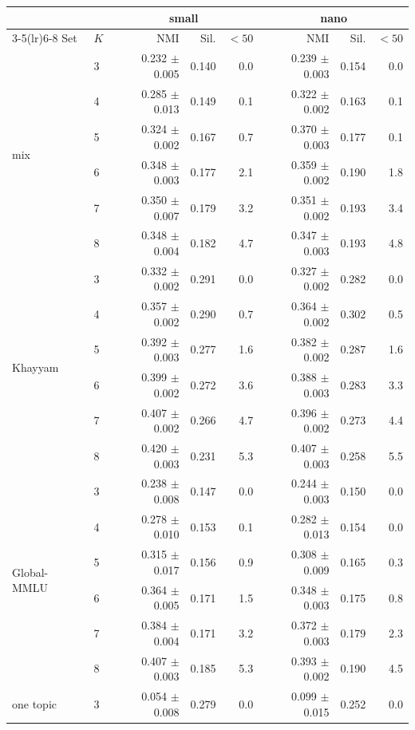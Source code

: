 \begin{tabular}{llrrrrrr}
\toprule
 & & \multicolumn{3}{c}{small} & \multicolumn{3}{c}{nano} \\
\cmidrule(lr){3-5}\cmidrule(lr){6-8}
Set & $K$ & NMI & Sil. & $<50$ & NMI & Sil. & $<50$ \\
\midrule
\multirow{6}{*}{mix} & 3 & 0.232 $\pm$ 0.005 & 0.140 & 0.0 & 0.239 $\pm$ 0.003 & 0.154 & 0.0 \\
 & 4 & 0.285 $\pm$ 0.013 & 0.149 & 0.1 & 0.322 $\pm$ 0.002 & 0.163 & 0.1 \\
 & 5 & 0.324 $\pm$ 0.002 & 0.167 & 0.7 & 0.370 $\pm$ 0.003 & 0.177 & 0.1 \\
 & 6 & 0.348 $\pm$ 0.003 & 0.177 & 2.1 & 0.359 $\pm$ 0.002 & 0.190 & 1.8 \\
 & 7 & 0.350 $\pm$ 0.007 & 0.179 & 3.2 & 0.351 $\pm$ 0.002 & 0.193 & 3.4 \\
 & 8 & 0.348 $\pm$ 0.004 & 0.182 & 4.7 & 0.347 $\pm$ 0.003 & 0.193 & 4.8 \\
\midrule
\multirow{6}{*}{Khayyam} & 3 & 0.332 $\pm$ 0.002 & 0.291 & 0.0 & 0.327 $\pm$ 0.002 & 0.282 & 0.0 \\
 & 4 & 0.357 $\pm$ 0.002 & 0.290 & 0.7 & 0.364 $\pm$ 0.002 & 0.302 & 0.5 \\
 & 5 & 0.392 $\pm$ 0.003 & 0.277 & 1.6 & 0.382 $\pm$ 0.002 & 0.287 & 1.6 \\
 & 6 & 0.399 $\pm$ 0.002 & 0.272 & 3.6 & 0.388 $\pm$ 0.003 & 0.283 & 3.3 \\
 & 7 & 0.407 $\pm$ 0.002 & 0.266 & 4.7 & 0.396 $\pm$ 0.002 & 0.273 & 4.4 \\
 & 8 & 0.420 $\pm$ 0.003 & 0.231 & 5.3 & 0.407 $\pm$ 0.003 & 0.258 & 5.5 \\
\midrule
\multirow{6}{*}{Global-MMLU} & 3 & 0.238 $\pm$ 0.008 & 0.147 & 0.0 & 0.244 $\pm$ 0.003 & 0.150 & 0.0 \\
 & 4 & 0.278 $\pm$ 0.010 & 0.153 & 0.1 & 0.282 $\pm$ 0.013 & 0.154 & 0.0 \\
 & 5 & 0.315 $\pm$ 0.017 & 0.156 & 0.9 & 0.308 $\pm$ 0.009 & 0.165 & 0.3 \\
 & 6 & 0.364 $\pm$ 0.005 & 0.171 & 1.5 & 0.348 $\pm$ 0.003 & 0.175 & 0.8 \\
 & 7 & 0.384 $\pm$ 0.004 & 0.171 & 3.2 & 0.372 $\pm$ 0.003 & 0.179 & 2.3 \\
 & 8 & 0.407 $\pm$ 0.003 & 0.185 & 5.3 & 0.393 $\pm$ 0.002 & 0.190 & 4.5 \\
\midrule
\multirow{6}{*}{one topic} & 3 & 0.054 $\pm$ 0.008 & 0.279 & 0.0 & 0.099 $\pm$ 0.015 & 0.252 & 0.0 \\

\end{tabular}
